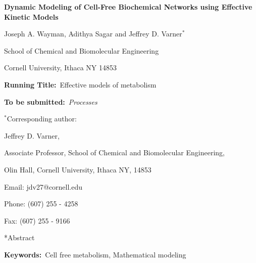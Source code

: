 \documentclass[12pt]{article}
\makeatletter
\renewcommand\section{\@startsection
	{subsection}{2}{0mm}
	{-0.2in}
	{0.05\baselineskip}
	{\normalfont\large\bfseries}}
\makeatother
\begin{document}
\begin{titlepage}
{\par\centering\textbf{\Large Dynamic Modeling of Cell-Free Biochemical Networks using Effective Kinetic Models}}
\vspace{0.05in}
{\par \centering \large{Joseph A. Wayman, Adithya Sagar and Jeffrey D. Varner$^{*}$}}
\vspace{0.10in}
{\par \centering \large{School of Chemical and Biomolecular Engineering}}
{\par \centering \large{Cornell University, Ithaca NY 14853}}
\vspace{0.1in}
{\par \centering \textbf{Running Title:}~Effective models of metabolism}
\vspace{0.1in}
{\par \centering \textbf{To be submitted:}~\emph{Processes}}
\vspace{0.5in}
{\par \centering $^{*}$Corresponding author:}
{\par \centering Jeffrey D. Varner,}
{\par \centering Associate Professor, School of Chemical and Biomolecular Engineering,}
{\par {} Olin Hall, Cornell University, Ithaca NY, 14853} 
{\par \centering Email: jdv27@cornell.edu} 
{\par \centering Phone: (607) 255 - 4258}
{\par \centering Fax: (607) 255 - 9166}
\end{titlepage}
\date{}
\thispagestyle{empty}
\pagebreak
\section*{Abstract}

{\noindent \textbf{Keywords:}~Cell free metabolism, Mathematical modeling}

\pagebreak

\setcounter{page}{1}

\linenumbers
\end{document}
